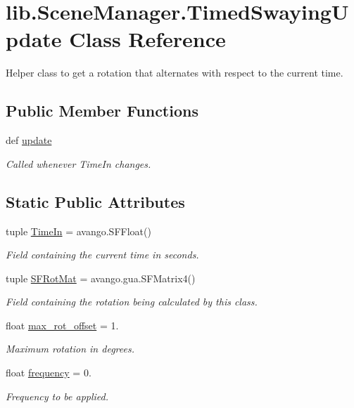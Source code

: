 \hypertarget{classlib_1_1SceneManager_1_1TimedSwayingUpdate}{\section{lib.\-Scene\-Manager.\-Timed\-Swaying\-Update \-Class \-Reference}
\label{classlib_1_1SceneManager_1_1TimedSwayingUpdate}
}


\-Helper class to get a rotation that alternates with respect to the current time.  


\subsection*{\-Public \-Member \-Functions}
\begin{DoxyCompactItemize}
\item 
def \hyperlink{classlib_1_1SceneManager_1_1TimedSwayingUpdate_acbe74cb12ae9e2a77c58474ab4b6a2a8}{update}
\begin{DoxyCompactList}\small\item\em \-Called whenever \-Time\-In changes. \end{DoxyCompactList}\end{DoxyCompactItemize}
\subsection*{\-Static \-Public \-Attributes}
\begin{DoxyCompactItemize}
\item 
tuple \hyperlink{classlib_1_1SceneManager_1_1TimedSwayingUpdate_aeefca4eea9d39278c55f392612f6879d}{\-Time\-In} = avango.\-S\-F\-Float()
\begin{DoxyCompactList}\small\item\em \-Field containing the current time in seconds. \end{DoxyCompactList}\item 
tuple \hyperlink{classlib_1_1SceneManager_1_1TimedSwayingUpdate_a7cf16c8e96b39294766dc321967e7fb3}{\-S\-F\-Rot\-Mat} = avango.\-gua.\-S\-F\-Matrix4()
\begin{DoxyCompactList}\small\item\em \-Field containing the rotation being calculated by this class. \end{DoxyCompactList}\item 
float \hyperlink{classlib_1_1SceneManager_1_1TimedSwayingUpdate_a64197c3f88fd9ed5e77d1adf46b5d183}{max\-\_\-rot\-\_\-offset} = 1.
\begin{DoxyCompactList}\small\item\em \-Maximum rotation in degrees. \end{DoxyCompactList}\item 
float \hyperlink{classlib_1_1SceneManager_1_1TimedSwayingUpdate_abffc534f3d004294c62ab10d14fc4df3}{frequency} = 0.
\begin{DoxyCompactList}\small\item\em \-Frequency to be applied. \end{DoxyCompactList}\end{DoxyCompactItemize}


